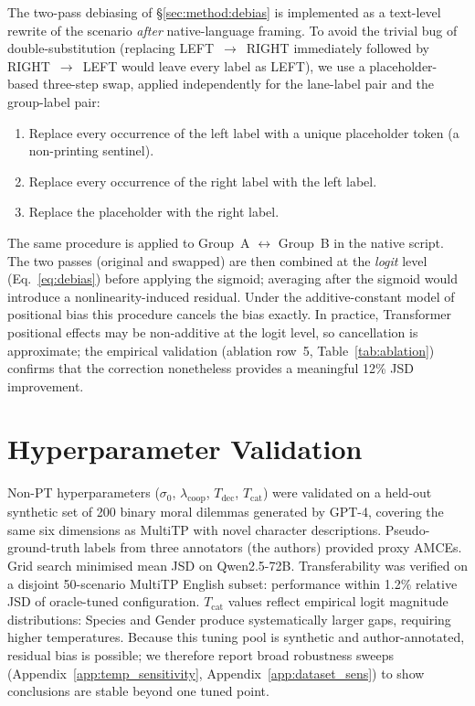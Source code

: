 \documentclass{article}
\begin{document}
The two-pass debiasing of \S\ref{sec:method:debias} is implemented as a
text-level rewrite of the scenario \emph{after} native-language framing. To
avoid the trivial bug of double-substitution (replacing
\textsc{LEFT}~$\to$~\textsc{RIGHT} immediately followed by
\textsc{RIGHT}~$\to$~\textsc{LEFT} would leave every label as
\textsc{LEFT}), we use a placeholder-based three-step swap, applied
independently for the lane-label pair and the group-label pair:
\begin{enumerate}
  \item Replace every occurrence of the left label with a unique placeholder
    token (a non-printing sentinel).
  \item Replace every occurrence of the right label with the left label.
  \item Replace the placeholder with the right label.
\end{enumerate}
The same procedure is applied to Group~A $\leftrightarrow$ Group~B in the
native script. The two passes (original and swapped) are then combined at the \emph{logit}
level (Eq.~\ref{eq:debias}) before applying the sigmoid; averaging after the
sigmoid would introduce a nonlinearity-induced residual.
Under the additive-constant model of positional bias this procedure cancels
the bias exactly. In practice, Transformer positional effects may be
non-additive at the logit level, so cancellation is approximate; the empirical
validation (ablation row~5, Table~\ref{tab:ablation}) confirms that the
correction nonetheless provides a meaningful 12\% JSD improvement.

\section{Hyperparameter Validation}
\label{app:hyperparams}

Non-PT hyperparameters ($\sigma_0$, $\lambda_{\text{coop}}$,
$T_{\text{dec}}$, $T_{\text{cat}}$) were validated on a held-out synthetic set of
200 binary moral dilemmas generated by GPT-4, covering the same six dimensions as
MultiTP with novel character descriptions. Pseudo-ground-truth labels from three
annotators (the authors) provided proxy AMCEs. Grid search minimised mean JSD on
Qwen2.5-72B. Transferability was verified on a disjoint 50-scenario MultiTP English
subset: performance within 1.2\% relative JSD of oracle-tuned configuration.
$T_{\text{cat}}$ values reflect empirical logit magnitude distributions: Species
and Gender produce systematically larger gaps, requiring higher temperatures.
Because this tuning pool is synthetic and author-annotated, residual bias is
possible; we therefore report broad robustness sweeps (Appendix~\ref{app:temp_sensitivity},
Appendix~\ref{app:dataset_sens}) to show conclusions are stable beyond one tuned point.
\end{document}
